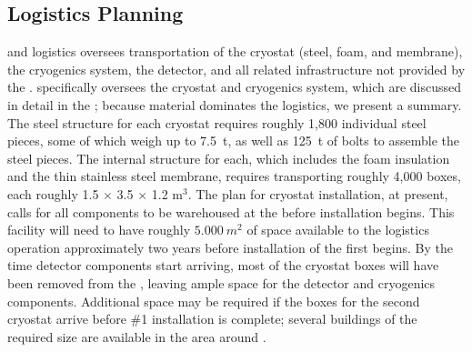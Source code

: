 \subsection{Logistics Planning}
\label{sec:fdsp-tc-logPln}

 and  logistics oversees transportation of the cryostat (steel, foam, and membrane), the cryogenics system, the detector, and all related infrastructure not provided by %
the .  specifically oversees the cryostat and cryogenics system, which %
are  discussed in detail in %
the  ; 
 because  material dominates the logistics, we present a summary. %
The %
steel structure for each cryostat requires %
roughly 1,800 individual steel pieces, %
some of which weigh up to \SI{7.5}{t}, as well as \SI{125}{t} of bolts to assemble the steel pieces. The internal structure for each, which includes the foam insulation and the thin stainless steel membrane, %
requires transporting roughly 4,000 boxes, 
 each roughly 1.5 $\times$ 3.5 $\times$ 1.2 m$^3$. The plan for cryostat installation, at present, calls for all components to be warehoused at the  before installation begins. %
This facility will need to have %
roughly $\SI{5,000}{m^2}$ of  space available to the logistics operation approximately two years before installation of the first  begins. By the time detector components start arriving, most of the cryostat boxes will have been removed from the , leaving ample space for the detector and cryogenics components. 
Additional space may be required if the boxes for the second cryostat arrive before   \#1 installation is complete; several buildings of the required size are available in the area around . %

